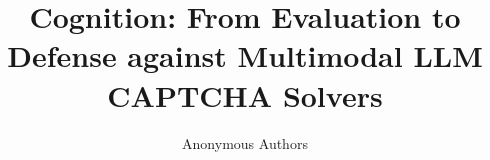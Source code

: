 \documentclass[sigconf, review]{acmart}
\begin{document}

\title{Cognition: From Evaluation to Defense against Multimodal LLM CAPTCHA Solvers}








\author{Anonymous Authors}
\renewcommand\footnotetextcopyrightpermission[1]{}

\end{document}
